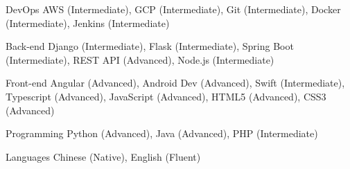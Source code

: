 

\begin{cvskills}

  \cvskill
    {DevOps} %
    {AWS (Intermediate), GCP (Intermediate), Git (Intermediate), Docker (Intermediate), Jenkins (Intermediate)} %

  \cvskill
    {Back-end} %
    {Django (Intermediate), Flask (Intermediate), Spring Boot (Intermediate), REST API (Advanced), Node.js (Intermediate)} %

  \cvskill
    {Front-end} %
    {Angular (Advanced), Android Dev (Advanced), Swift (Intermediate), Typescript (Advanced), JavaScript (Advanced), HTML5 (Advanced), CSS3 (Advanced)} %

  \cvskill
    {Programming} %
    {Python (Advanced), Java (Advanced), PHP (Intermediate)} %

  \cvskill
    {Languages} %
    {Chinese (Native), English (Fluent)} %

\end{cvskills}
